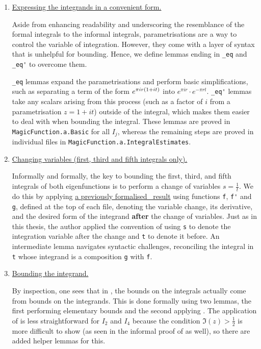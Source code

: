 \begin{enumerate}
    \item \underline{Expressing the integrands in a convenient form.}

    Aside from enhancing readability and underscoring the resemblance of the formal integrals to the informal integrals, parametrisations are a way to control the variable of integration. However, they come with a layer of syntax that is unhelpful for bounding. Hence, we define lemmas ending in \lstinline|_eq| and \lstinline|_eq'| to overcome them.
    
    \lstinline|_eq| lemmas expand the parametrisations and perform basic simplifications, such as separating a term of the form $e^{\pi i r\left( 1 + it \right)}$ into $e^{\pi i r} \cdot e^{-\pi r t}$. \lstinline|_eq'| lemmas take any scalars arising from this process (such as a factor of $i$ from a parametrisation $z = 1 + it$) outside of the integral, which makes them easier to deal with when bounding the integral. These lemmas are proved in \lstinline|MagicFunction.a.Basic| for all $I_j$, whereas the remaining steps are proved in individual files in \lstinline|MagicFunction.a.IntegralEstimates|.

    \item \underline{Changing variables (first, third and fifth integrals only).}

    Informally and formally, the key to bounding the first, third, and fifth integrals of both eigenfunctions is to perform a change of variables $s = \frac{1}{t}$. We do this by applying \href{https://github.com/leanprover-community/mathlib4/blob/5a2eaa85c555c4263e15928cef249cbaad2eb2d2/Mathlib/MeasureTheory/Function/Jacobian.lean#L1199}{a previously formalised \mathlib\ result} using functions \lstinline|f|, \lstinline|f'| and \lstinline|g|, defined at the top of each file, denoting the variable change, its derivative, and the desired form of the integrand \textbf{after} the change of variables. Just as in this thesis, the author applied the convention of using \lstinline|s| to denote the integration variable after the change and \lstinline|t| to denote it before. An intermediate lemma navigates syntactic challenges, reconciling the integral in \lstinline|t| whose integrand is a composition \lstinline|g| with \lstinline|f|.

    \item \underline{Bounding the integrand.}

    By inspection, one sees that in , the bounds on the integrals actually come from bounds on the integrands. This is done formally using two lemmas, the first performing elementary bounds and the second applying . The application of  is less straightforward for $I_2$ and $I_4$ because the condition $\Im(z) > \frac{1}{2}$ is more difficult to show (as seen in the informal proof of  as well), so there are added helper lemmas for this.


\end{enumerate}
